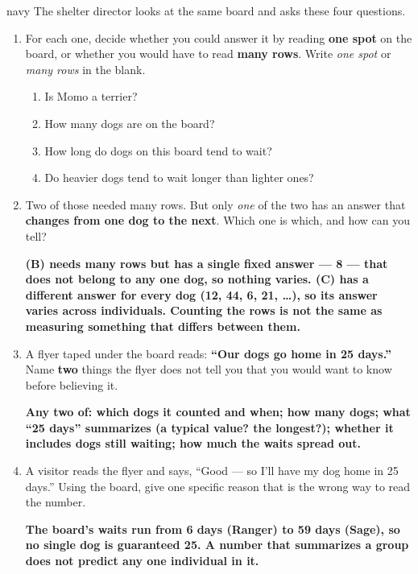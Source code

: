\documentclass[12pt]{article}
\newcommand{\answerspace}[2]{\par\nopagebreak\noindent\begin{minipage}[t][#1][t]{\linewidth}%
  \color{keyred}\bfseries #2\end{minipage}\par}
\begin{document}
\boxguard[16]
\begin{scenariobox}{navy}
The shelter director looks at the same board and asks these four questions.

\begin{enumerate}[label=\textbf{\alph*.}, leftmargin=1.8em, itemsep=8pt]
  \item For each one, decide whether you could answer it by reading \textbf{one spot} on the
        board, or whether you would have to read \textbf{many rows}. Write \emph{one spot} or
        \emph{many rows} in the blank.

        \begin{enumerate}[label=\textbf{(\Alph*)}, leftmargin=2.2em, itemsep=5pt]
          \item Is Momo a terrier? \hfill {}
          \item How many dogs are on the board? \hfill {}
          \item How long do dogs on this board tend to wait? \hfill {}
          \item Do heavier dogs tend to wait longer than lighter ones? \hfill {}
        \end{enumerate}
  \item Two of those needed many rows. But only \emph{one} of the two has an answer that
        \textbf{changes from one dog to the next}. Which one is which, and how can you tell?
        \answerspace{2.6cm}{(B) needs many rows but has a single fixed answer --- 8 --- that
        does not belong to any one dog, so nothing varies. (C) has a different answer for every
        dog (12, 44, 6, 21, \dots), so its answer varies across individuals. Counting the rows
        is not the same as measuring something that differs between them.}
  \item A flyer taped under the board reads: \textbf{``Our dogs go home in 25 days.''}
        Name \textbf{two} things the flyer does not tell you that you would want to know
        before believing it.
        \answerspace{2.0cm}{Any two of: which dogs it counted and when; how many dogs;
        what ``25 days'' summarizes (a typical value? the longest?); whether it includes dogs
        still waiting; how much the waits spread out.}
  \item A visitor reads the flyer and says, ``Good --- so I'll have my dog home in 25 days.''
        Using the board, give one specific reason that is the wrong way to read the number.
        \answerspace{2.0cm}{The board's waits run from 6 days (Ranger) to 59 days (Sage), so
        no single dog is guaranteed 25. A number that summarizes a group does not predict any
        one individual in it.}
\end{enumerate}
\end{scenariobox}
\end{document}
